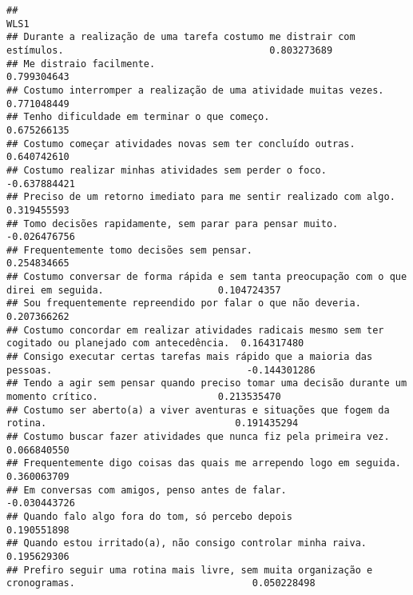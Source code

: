 \documentclass[
]{article}
\begin{document}
\begin{verbatim}
##                                                                                                                 WLS1
## Durante a realização de uma tarefa costumo me distrair com estímulos.                                    0.803273689
## Me distraio facilmente.                                                                                  0.799304643
## Costumo interromper a realização de uma atividade muitas vezes.                                          0.771048449
## Tenho dificuldade em terminar o que começo.                                                              0.675266135
## Costumo começar atividades novas sem ter concluído outras.                                               0.640742610
## Costumo realizar minhas atividades sem perder o foco.                                                   -0.637884421
## Preciso de um retorno imediato para me sentir realizado com algo.                                        0.319455593
## Tomo decisões rapidamente, sem parar para pensar muito.                                                 -0.026476756
## Frequentemente tomo decisões sem pensar.                                                                 0.254834665
## Costumo conversar de forma rápida e sem tanta preocupação com o que direi em seguida.                    0.104724357
## Sou frequentemente repreendido por falar o que não deveria.                                              0.207366262
## Costumo concordar em realizar atividades radicais mesmo sem ter cogitado ou planejado com antecedência.  0.164317480
## Consigo executar certas tarefas mais rápido que a maioria das pessoas.                                  -0.144301286
## Tendo a agir sem pensar quando preciso tomar uma decisão durante um momento crítico.                     0.213535470
## Costumo ser aberto(a) a viver aventuras e situações que fogem da rotina.                                 0.191435294
## Costumo buscar fazer atividades que nunca fiz pela primeira vez.                                         0.066840550
## Frequentemente digo coisas das quais me arrependo logo em seguida.                                       0.360063709
## Em conversas com amigos, penso antes de falar.                                                          -0.030443726
## Quando falo algo fora do tom, só percebo depois                                                          0.190551898
## Quando estou irritado(a), não consigo controlar minha raiva.                                             0.195629306
## Prefiro seguir uma rotina mais livre, sem muita organização e cronogramas.                               0.050228498

\end{verbatim}
\end{document}
